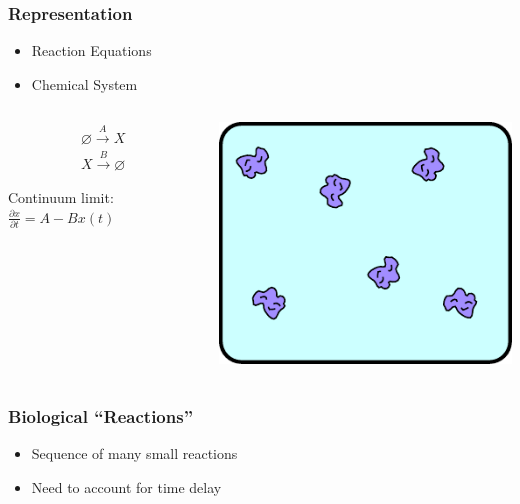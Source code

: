 \documentclass[xcolor={usenames,dvipsnames,svgnames},url=hyphens]{beamer}
\begin{document}
\begin{frame}
    \frametitle{Representation}
    \begin{itemize}
        \item Reaction Equations
        \item Chemical System
    \end{itemize}
    \begin{columns}
        \begin{column}[T]{0.5\textwidth}
            \begin{align*}
                \varnothing \xrightarrow{A} X \\
                X \xrightarrow {B} \varnothing
            \end{align*}
            \begin{center}
                Continuum limit: $\frac{\partial x}{\partial t} = A - B x(t)$
            \end{center}
        \end{column}
        \begin{column}[T]{0.5\textwidth}
            \includegraphics[width=\textwidth]{figures/chemical-system.pdf}
        \end{column}
    \end{columns}

\end{frame}

\begin{frame}
    \frametitle{Biological ``Reactions''}
    \begin{itemize}
        \item Sequence of many small reactions
        \item Need to account for time delay
    \end{itemize}
    \begin{center}
        
    \end{center}
\end{frame}
\end{document}
